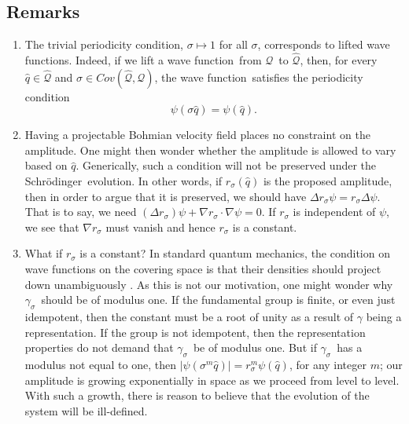\documentclass[11pt]{article}
\theoremstyle{remark}
\begin{document}
\subsection{Remarks}

\begin{enumerate}

\item The trivial periodicity condition, $\ensuremath{\sigma} \mapsto 1$ for all
\ensuremath{\sigma}, corresponds to lifted wave functions. Indeed, 
if we
lift a wave function\ from \ensuremath{\mathcal{Q}}\ to \ensuremath{\widehat{\ensuremath{\mathcal{Q}}}}, then, for every $\ensuremath{\hat{q}} \in
\ensuremath{\widehat{\ensuremath{\mathcal{Q}}}}$
and $\ensuremath{\sigma} \in \ensuremath{Cov(\ensuremath{\widehat{\ensuremath{\mathcal{Q}}}}, \ensuremath{\mathcal{Q}})}$,
the wave function\ satisfies the
periodicity condition
\begin{equation*}
\ensuremath{\psi} (\ensuremath{\sigma}\ensuremath{\hat{q}})
= \ensuremath{\psi}(\ensuremath{\hat{q}}).
\end{equation*}

\item Having a projectable Bohmian velocity field places no constraint
on the amplitude. 
One might then wonder whether the amplitude is allowed
to vary based on \ensuremath{\hat{q}}. Generically, such a condition will not be
preserved under the Schr\"odinger\ evolution. 
In other words, if $r_{\ensuremath{\sigma}} (\ensuremath{\hat{q}})$ is the proposed
amplitude, then in order to argue that it is preserved, we should have
$\ensuremath{\Delta} r_{\ensuremath{\sigma}} \ensuremath{\psi} = r_{\ensuremath{\sigma}} \ensuremath{\Delta}\ensuremath{\psi}$. That is to say, we need
$(\ensuremath{\Delta} r_{\ensuremath{\sigma}}) \ensuremath{\psi} + \nabla r_{\ensuremath{\sigma}} \cdot \nabla \ensuremath{\psi} =
0$. If $r_{\ensuremath{\sigma}}$ is independent of $\ensuremath{\psi}$, we see that
$\nabla r_{\ensuremath{\sigma}}$ must 
vanish and hence $r_{\ensuremath{\sigma}}$ is a constant.  

\item What if $r_{\ensuremath{\sigma}}$ is a constant? 
In standard quantum mechanics, the condition on wave functions on the covering
space is that their densities should project down unambiguously \cite{Mor92}. 
As this is not our motivation, one might wonder why \ensuremath{\gamma_{\ensuremath{\sigma}}}\ should be
of modulus one.  If the 
fundamental group is 
finite, or even just idempotent, then the constant must be a root of
unity as a result of $\gamma$ being a representation. If   
 the  group is not idempotent, then the representation properties do
not demand that \ensuremath{\gamma_{\ensuremath{\sigma}}}\ be 
of modulus one. But 
if \ensuremath{\gamma_{\ensuremath{\sigma}}}\ has a modulus not
equal to one, then $|\ensuremath{\psi}({\ensuremath{\sigma}^m} \ensuremath{\hat{q}})| = r_{\ensuremath{\sigma}}^{m}\ensuremath{\psi}(\ensuremath{\hat{q}})$,
for any integer $m$;
our amplitude is growing exponentially in space as we proceed from
level to level. 
With such a growth, there 
is reason to believe  that the evolution of the system
will be ill-defined. 


\end{enumerate}
\end{document}
